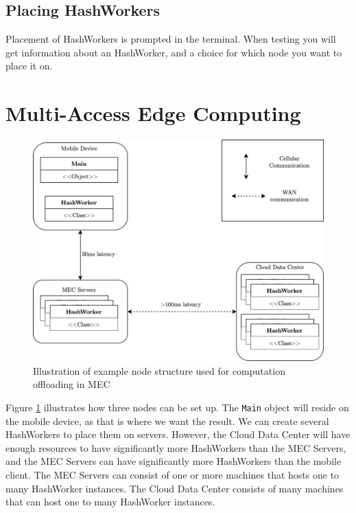 \subsection{Placing HashWorkers}
Placement of HashWorkers is prompted in the terminal. When testing you will get information about an HashWorker, and a choice for which node you want to place it on. 















\section{Multi-Access Edge Computing}

\begin{figure}[t]
    \centering
    \includegraphics[scale=1]{chapters/5_implementation/figures/MEC_implementation.png}
    \caption{Illustration of example node structure used for computation offloading in MEC}
    \label{fig:MEC_implementation}
\end{figure}
Figure \ref{fig:MEC_implementation} illustrates how three nodes can be set up. The \verb|Main| object will reside on the mobile device, as that is where we want the result. We can create several HashWorkers to place them on servers. However, the Cloud Data Center will have enough resources to have significantly more HashWorkers than the MEC Servers, and the MEC Servers can have significantly more HashWorkers than the mobile client. The MEC Servers can consist of one or more machines that hosts one to many HashWorker instances. The Cloud Data Center consists of many machines that can host one to many HashWorker instances.




